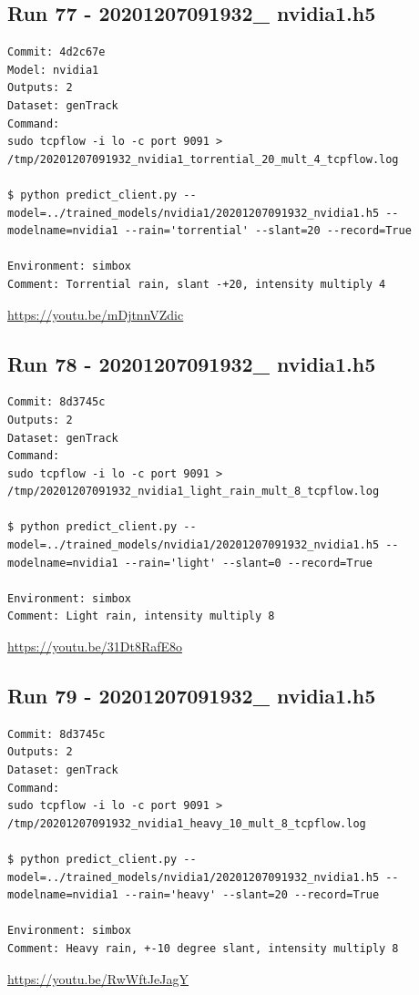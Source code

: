 \subsection{Run 77 - 20201207091932\_ nvidia1.h5 }
\begin{verbatim}
Commit: 4d2c67e
Model: nvidia1
Outputs: 2
Dataset: genTrack
Command:
sudo tcpflow -i lo -c port 9091 > /tmp/20201207091932_nvidia1_torrential_20_mult_4_tcpflow.log

$ python predict_client.py --model=../trained_models/nvidia1/20201207091932_nvidia1.h5 --modelname=nvidia1 --rain='torrential' --slant=20 --record=True

Environment: simbox
Comment: Torrential rain, slant -+20, intensity multiply 4
\end{verbatim}
\url{https://youtu.be/mDjtnnVZdic}

\subsection{Run 78 - 20201207091932\_ nvidia1.h5 }
\begin{verbatim}
Commit: 8d3745c 
Outputs: 2
Dataset: genTrack
Command:
sudo tcpflow -i lo -c port 9091 > /tmp/20201207091932_nvidia1_light_rain_mult_8_tcpflow.log

$ python predict_client.py --model=../trained_models/nvidia1/20201207091932_nvidia1.h5 --modelname=nvidia1 --rain='light' --slant=0 --record=True

Environment: simbox
Comment: Light rain, intensity multiply 8
\end{verbatim}
\url{https://youtu.be/31Dt8RafE8o}

\subsection{Run 79 - 20201207091932\_ nvidia1.h5 }
\begin{verbatim}
Commit: 8d3745c 
Outputs: 2
Dataset: genTrack
Command:
sudo tcpflow -i lo -c port 9091 > /tmp/20201207091932_nvidia1_heavy_10_mult_8_tcpflow.log

$ python predict_client.py --model=../trained_models/nvidia1/20201207091932_nvidia1.h5 --modelname=nvidia1 --rain='heavy' --slant=20 --record=True

Environment: simbox
Comment: Heavy rain, +-10 degree slant, intensity multiply 8
\end{verbatim}
\url{https://youtu.be/RwWftJeJagY}

